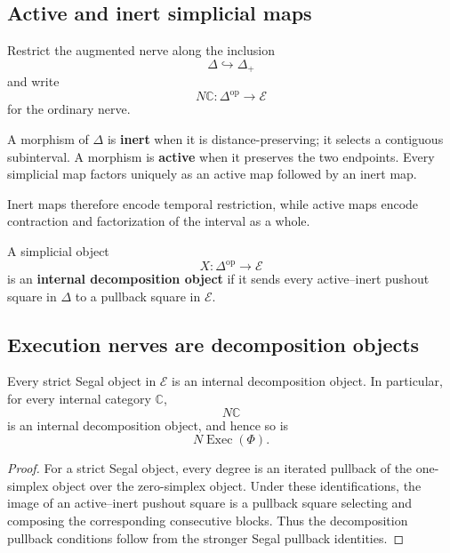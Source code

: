 \subsection{Active and inert simplicial maps}
\label{subsec:active-inert-maps}

Restrict the augmented nerve along the inclusion
\[
    \Delta\hookrightarrow\Delta_+
\]
and write
\[
    N\mathbb C:\Delta^{\mathrm{op}}\to\mathcal E
\]
for the ordinary nerve.

A morphism of \(\Delta\) is \textbf{inert} when it is distance-preserving;
it selects a contiguous subinterval. A morphism is \textbf{active} when it
preserves the two endpoints. Every simplicial map factors uniquely as an
active map followed by an inert map.

Inert maps therefore encode temporal restriction, while active maps encode
contraction and factorization of the interval as a whole.

\begin{definition}
\label{def:internal-decomposition-object}
A simplicial object
\[
    X:\Delta^{\mathrm{op}}\to\mathcal E
\]
is an \textbf{internal decomposition object} if it sends every active--inert
pushout square in \(\Delta\) to a pullback square in \(\mathcal E\).
\end{definition}

\subsection{Execution nerves are decomposition objects}
\label{subsec:execution-nerve-decomposition}

\begin{theorem}
\label{thm:segal-implies-decomposition}
Every strict Segal object in \(\mathcal E\) is an internal decomposition
object. In particular, for every internal category \(\mathbb C\),
\[
    N\mathbb C
\]
is an internal decomposition object, and hence so is
\[
    N\operatorname{Exec}(\Phi).
\]
\end{theorem}

\begin{proof}
For a strict Segal object, every degree is an iterated pullback of the
one-simplex object over the zero-simplex object. Under these identifications,
the image of an active--inert pushout square is a pullback square selecting
and composing the corresponding consecutive blocks. Thus the decomposition
pullback conditions follow from the stronger Segal pullback identities.
\end{proof}

